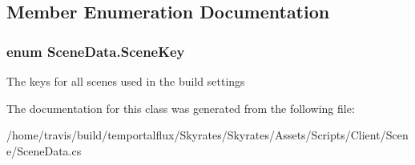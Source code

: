 \subsection{Member Enumeration Documentation}
\hypertarget{class_scene_data_a79d397b3deef242a865470283d96f2e6}{
\subsubsection[{Scene\-Key}]{\setlength{\rightskip}{0pt plus 5cm}enum {\bf Scene\-Data.\-Scene\-Key}}}\label{class_scene_data_a79d397b3deef242a865470283d96f2e6}


The keys for all scenes used in the build settings 



The documentation for this class was generated from the following file\-:\begin{DoxyCompactItemize}
\item 
/home/travis/build/temportalflux/\-Skyrates/\-Skyrates/\-Assets/\-Scripts/\-Client/\-Scene/Scene\-Data.\-cs\end{DoxyCompactItemize}
